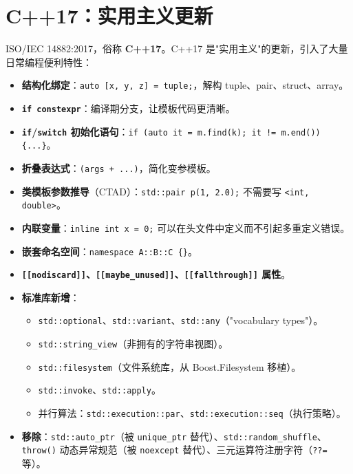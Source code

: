 \documentclass[12pt,a4paper,fontset=fandol]{ctexbook}
\newcommand{\yearlabel}[1]{%
  \tcbox[on line,colback=yearheadbg,colframe=yearheadbg,
    boxrule=0pt,arc=1pt,left=3pt,right=3pt,top=1pt,bottom=1pt,
    colupper=white,fontupper=\scriptsize\bfseries]{#1}}
\newcommand{\kw}[1]{\texttt{#1}}
\newcommand{\yrlbl}[1]{\yearlabel{#1}}
\begin{document}
\section{C++17：实用主义更新}

\yrlbl{2017} ISO/IEC 14882:2017，俗称 \textbf{C++17}。C++17 是"实用主义"的更新，引入了大量日常编程便利特性：

\begin{itemize}
  \item \textbf{结构化绑定}：\kw{auto [x, y, z] = tuple;}，解构 tuple、pair、struct、array。
  \item \textbf{\kw{if constexpr}}：编译期分支，让模板代码更清晰。
  \item \textbf{\kw{if}/\allowbreak{}\kw{switch} 初始化语句}：\kw{if (auto it = m.find(k); it != m.end()) \{...\}}。
  \item \textbf{折叠表达式}：\kw{(args + ...)}，简化变参模板。
  \item \textbf{类模板参数推导}（CTAD）：\kw{std::pair p(1, 2.0);} 不需要写 \kw{<int, double>}。
  \item \textbf{内联变量}：\kw{inline int x = 0;} 可以在头文件中定义而不引起多重定义错误。
  \item \textbf{嵌套命名空间}：\kw{namespace A::B::C \{\}}。
  \item \textbf{\kw{[[nodiscard]]}、\kw{[[maybe\_unused]]}、\kw{[[fallthrough]]} 属性}。
  \item \textbf{标准库新增}：
    \begin{itemize}
      \item \kw{std::optional}、\kw{std::variant}、\kw{std::any}（"vocabulary types"）。
      \item \kw{std::string\_view}（非拥有的字符串视图）。
      \item \kw{std::filesystem}（文件系统库，从 Boost.Filesystem 移植）。
      \item \kw{std::invoke}、\kw{std::apply}。
      \item 并行算法：\kw{std::execution::par}、\kw{std::execution::seq}（执行策略）。
    \end{itemize}
  \item \textbf{移除}：\kw{std::auto\_ptr}（被 \kw{unique\_ptr} 替代）、\kw{std::random\_shuffle}、\kw{throw()} 动态异常规范（被 \kw{noexcept} 替代）、三元运算符注册字符（\kw{??=} 等）。
\end{itemize}
\end{document}

